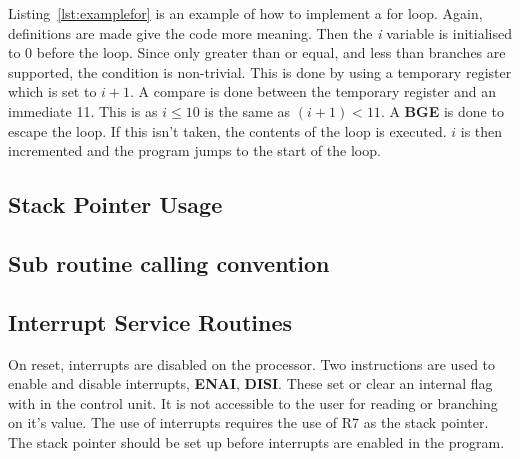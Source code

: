 

Listing~\ref{lst:examplefor} is an example of how to implement a for loop. 
Again, definitions are made give the code more meaning. 
Then the \textit{i} variable is initialised to 0 before the loop. 
Since only greater than or equal, and less than branches are supported, the condition is non-trivial.
This is done by using a temporary register which is set to $i + 1$. 
A compare is done between the temporary register and an immediate 11.
This is as $i \leq 10$ is the same as $(i+1) < 11$. 
A \textbf{BGE} is done to escape the loop. 
If this isn't taken, the contents of the loop is executed.
$i$ is then incremented and the program jumps to the start of the loop. 







\subsection{Stack Pointer Usage}


\subsection{Sub routine calling convention}


\subsection{Interrupt Service Routines}

On reset, interrupts are disabled on the \samurai{} processor.
Two instructions are used to enable and disable interrupts, \textbf{ENAI}, \textbf{DISI}.
These set or clear an internal flag with in the control unit. 
It is not accessible to the user for reading or branching on it's value.
The use of interrupts requires the use of R7 as the stack pointer. 
The stack pointer should be set up before interrupts are enabled in the program.

